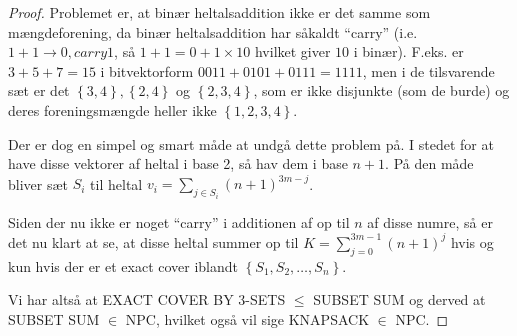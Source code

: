 \begin{proof}
Problemet er, at binær heltalsaddition ikke er det samme som mængdeforening, da
binær heltalsaddition har såkaldt ``carry'' (i.e. $1 + 1 \rightarrow 0, carry
1$, så $1 + 1 = 0 + 1 \times 10$ hvilket giver $10$ i binær). F.eks. er
$3+5+7=15$ i bitvektorform $0011 + 0101 + 0111 = 1111$, men i de tilsvarende
sæt er det $\left\lbrace 3,4 \right\rbrace, \left\lbrace 2,4 \right\rbrace$ og
$\left\lbrace 2,3,4 \right\rbrace$, som er ikke disjunkte (som de burde) og
deres foreningsmængde heller ikke $\left\lbrace 1,2,3,4 \right\rbrace$.

Der er dog en simpel og smart måde at undgå dette problem på. I stedet for at
have disse vektorer af heltal i base 2, så hav dem i base $n+1$. På den måde
bliver sæt $S_i$ til heltal $v_i = \sum_{j \in S_i} (n+1)^{3m-j}$.

Siden der nu ikke er noget ``carry'' i additionen af op til $n$ af disse numre,
så er det nu klart at se, at disse heltal summer op til $K = \sum_{j=0}^{3m-1}
(n+1)^j$ hvis og kun hvis der er et exact cover iblandt $\left\lbrace S_1, S_2,
\hdots, S_n \right\rbrace$.

Vi har altså at EXACT COVER BY 3-SETS $\leq$ SUBSET SUM og derved at SUBSET SUM
$\in$ NPC, hvilket også vil sige KNAPSACK $\in$ NPC. 
\end{proof}
